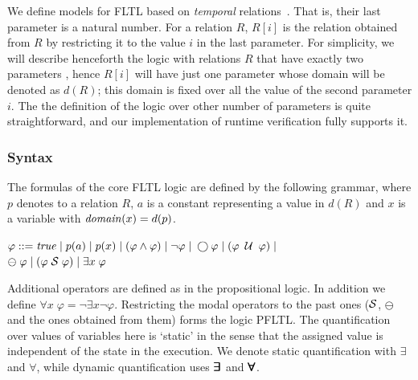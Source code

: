 We define models for FLTL based on {\em temporal} relations~\cite{Chomicki}. That is,
their last parameter
is a natural number. For a relation $R$, $R [ i ]$ is the relation obtained from $R$ by
restricting it to the value $i$ in the last parameter. For simplicity, we will describe henceforth
the logic with relations $R$ that have exactly two parameters
, hence $R [ i ]$ will have just one parameter whose domain will be denoted as $d ( R )$; this domain is fixed over all the value of the second parameter $i$. The the definition of the logic over other number of parameters is quite straightforward, and our implementation of runtime verification fully supports it.



\subsubsection{Syntax} 

The formulas of the core FLTL logic are 
defined by the following grammar,
where $p$ denotes to a relation $R$,
$a$ is a constant representing a value in $d ( R )$ and $x$ is a variable with $\mathit{domain} ( x ) = d ( p )$.
\begin{center}
$\varphi ::= \mathit{true}  \; | \;
    p ( a ) \; | \;
    p ( x ) \; | \;
    ( \varphi \wedge \varphi ) \;  |   \;
   \neg \varphi \; | \;
   \bigcirc \varphi \; | \; 
   ( \varphi \; \mathbin{\mathcal{U}} \; \varphi ) \; | $ \\
   $ \ominus \; \varphi \; | \;
    ( \varphi  \; {\cal S}  \; \varphi ) \; | \;
    \exists x \; \varphi$
\end{center}


\noindent 

Additional operators are defined as in the propositional logic. In addition we define
$\forall x \; \varphi = \neg \exists x \neg \varphi$.
Restricting the modal operators to the past ones
(${\cal S}$, $\ominus$ and the ones obtained from them) 
forms the logic PFLTL.
The quantification over values of variables here is `static' in the sense that
the assigned value is independent of the state in the execution. We
denote static quantification with $\exists$ and $\forall$, while
dynamic quantification uses $\bm{\exists}\kern-0.6em\bm{\exists}$ and $\bm{\forall}\kern-0.6em\bm{\forall}$.

